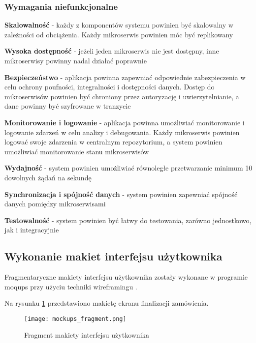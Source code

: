 \subsubsection{Wymagania niefunkcjonalne}


\textbf{Skalowalność} - każdy z komponentów systemu powinien być skalowalny w zależności od obciążenia. Każdy mikroserwis powinien móc być replikowany

\textbf{Wysoka dostępność} - jeżeli jeden mikroserwis nie jest dostępny, inne mikroserwisy powinny nadal działać poprawnie

\textbf{Bezpieczeństwo} - aplikacja powinna zapewniać odpowiednie zabezpieczenia w celu ochrony poufności, integralności i dostępności danych. Dostęp do mikroserwisów powinien być chroniony przez autoryzację i uwierzytelnianie, a dane powinny być szyfrowane w tranzycie

\textbf{Monitorowanie i logowanie} - aplikacja powinna umożliwiać monitorowanie i logowanie zdarzeń w celu analizy i debugowania. Każdy mikroserwis powinien logować swoje zdarzenia w centralnym repozytorium, a system powinien umożliwiać monitorowanie stanu mikroserwisów

\textbf{Wydajność} - system powinien umożliwiać równoległe przetwarzanie minimum 10 dowolnych żądań na sekundę

\textbf{Synchronizacja i spójność danych} - system powinien zapewniać spójność danych pomiędzy mikroserwisami
    
\textbf{Testowalność} - system powinien być łatwy do testowania, zarówno jednostkowo, jak i integracyjnie

\subsection{Wykonanie makiet interfejsu użytkownika}

Fragmentaryczne makiety interfejsu użytkownika zostały wykonane w programie moqups \cite{moqups} przy użyciu techniki wireframingu \cite{wireframing}.

Na rysunku \ref{fig:mockups} przedstawiono makietę ekranu finalizacji zamówienia.

\begin{figure}[!h]
    \centering \texttt{[image: mockups\_fragment.png]}
    \caption{Fragment makiety interfejsu użytkownika}
    \label{fig:mockups}
\end{figure}
